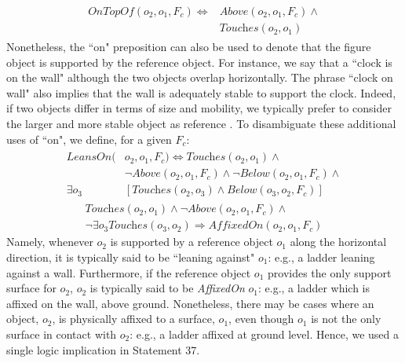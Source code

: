 \documentclass{article}
\begin{document}
\begin{align}
\begin{split}
     \textit{OnTopOf} (o_2,o_1,F_c)\Leftrightarrow &{} \textit{Above} (o_2,o_1,F_c)  \wedge  \\ & \textit{Touches} (o_2,o_1) 
     \end{split}
\end{align}
Nonetheless, the ``on" preposition can also be used to denote that the figure object is supported by the reference object. For instance, we say that a ``clock is on the wall" although the two objects overlap horizontally. The phrase ``clock on wall" also implies that the wall is adequately stable to support the clock. Indeed, if two objects differ in terms of size and mobility, we typically prefer to consider the larger and more stable object as reference \cite{landau_what_1993}. To disambiguate these additional uses of ``on", we define, for a given $F_c$:
\begin{align}
    \begin{split} \textit{LeansOn} (&{}o_2,o_1,F_c) \Leftrightarrow \textit{Touches} (o_2,o_1)  \wedge \\ 
    & \neg \textit{Above} (o_2,o_1,F_c) \wedge \neg \textit{Below} (o_2,o_1,F_c) \wedge  \\
    \exists o_3 &[\textit{Touches}(o_2,o_3) \wedge  \textit{Below} (o_3,o_2,F_c)]  \end{split}  
\end{align}
\begin{multline}
    \textit{Touches} (o_2,o_1)\wedge \neg \textit{Above}(o_2,o_1,F_c) \wedge \\
    \neg \exists o_3 \textit{Touches}(o_3,o_2) \Rightarrow \textit{AffixedOn} (o_2,o_1,F_c)
\end{multline}
Namely, whenever $o_2$ is supported by a reference object $o_1$ along the horizontal direction, it is typically said to be ``leaning against" $o_1$: e.g., a ladder leaning against a wall. Furthermore, if the reference object $o_1$ provides the only support surface for $o_2$, $o_2$ is typically said to be \textit{AffixedOn} $o_1$: e.g., a ladder which is affixed on the wall, above ground. Nonetheless, there may be cases where an object, $o_2$, is physically affixed to a surface, $o_1$, even though $o_1$ is not the only surface in contact with $o_2$: e.g., a ladder affixed at ground level. Hence, we used a single logic implication in Statement 37. 
\end{document}
